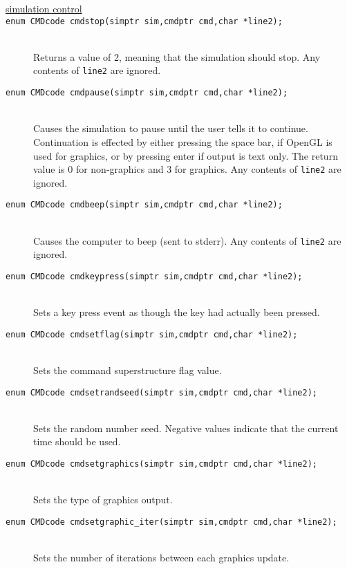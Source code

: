 \documentclass {scrbook}
\newcommand {\ttt} {\texttt}
\begin{document}
\begin{description}

\item[\underline{simulation control}]

\item[\ttt{enum CMDcode cmdstop(simptr sim,cmdptr cmd,char *line2);}]
\hfill \\
Returns a value of 2, meaning that the simulation should stop. Any contents of \ttt{line2} are ignored.

\item[\ttt{enum CMDcode cmdpause(simptr sim,cmdptr cmd,char *line2);}]
\hfill \\
Causes the simulation to pause until the user tells it to continue. Continuation is effected by either pressing the space bar, if OpenGL is used for graphics, or by pressing enter if output is text only. The return value is 0 for non-graphics and 3 for graphics. Any contents of \ttt{line2} are ignored.

\item[\ttt{enum CMDcode cmdbeep(simptr sim,cmdptr cmd,char *line2);}]
\hfill \\
Causes the computer to beep (sent to stderr). Any contents of \ttt{line2} are ignored.

\item[\ttt{enum CMDcode cmdkeypress(simptr sim,cmdptr cmd,char *line2);}]
\hfill \\
Sets a key press event as though the key had actually been pressed.

\item[\ttt{enum CMDcode cmdsetflag(simptr sim,cmdptr cmd,char *line2);}]
\hfill \\
Sets the command superstructure flag value.

\item[\ttt{enum CMDcode cmdsetrandseed(simptr sim,cmdptr cmd,char *line2);}]
\hfill \\
Sets the random number seed. Negative values indicate that the current time should be used.

\item[\ttt{enum CMDcode cmdsetgraphics(simptr sim,cmdptr cmd,char *line2);}]
\hfill \\
Sets the type of graphics output.

\item[\ttt{enum CMDcode cmdsetgraphic\_iter(simptr sim,cmdptr cmd,char *line2);}]
\hfill \\
Sets the number of iterations between each graphics update.


\end{description}
\end{document}
